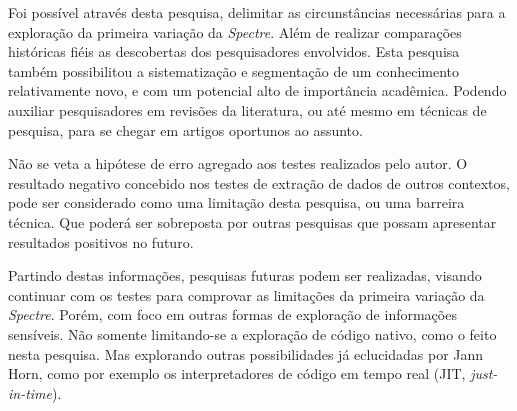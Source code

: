 \documentclass[
	article,			    %
	12pt,				    %
	oneside,			    %
	a4paper,			    %
	chapter=TITLE,		    %
	section=TITLE,		    %
	subsection=TITLE,	    %
	english,			    %
	brazil,				    %
	sumario=tradicional
]{abntex2}
\begin{document}
Foi possível através desta pesquisa, delimitar as circunstâncias necessárias para a exploração da primeira variação da \emph{Spectre}. Além de realizar comparações históricas fiéis as descobertas dos pesquisadores envolvidos. Esta pesquisa também possibilitou a sistematização e segmentação de um conhecimento relativamente novo, e com um potencial alto de importância acadêmica. Podendo auxiliar pesquisadores em revisões da literatura, ou até mesmo em técnicas de pesquisa, para se chegar em artigos oportunos ao assunto.

Não se veta a hipótese de erro agregado aos testes realizados pelo autor. O resultado negativo concebido nos testes de extração de dados de outros contextos, pode ser considerado como uma limitação desta pesquisa, ou uma barreira técnica. Que poderá ser sobreposta por outras pesquisas que possam apresentar resultados positivos no futuro.

Partindo destas informações, pesquisas futuras podem ser realizadas, visando continuar com os testes para comprovar as limitações da primeira variação da \emph{Spectre}. Porém, com foco em outras formas de exploração de informações sensíveis. Não somente limitando-se a exploração de código nativo, como o feito nesta pesquisa. Mas explorando outras possibilidades já eclucidadas por Jann Horn, como por exemplo os interpretadores de código em tempo real (JIT, \emph{just-in-time}).

\postextual

\begin{apendicesenv}
\end{apendicesenv}
\begin{anexosenv}
\vspace{\onelineskip}
\end{anexosenv}
\end{document}
